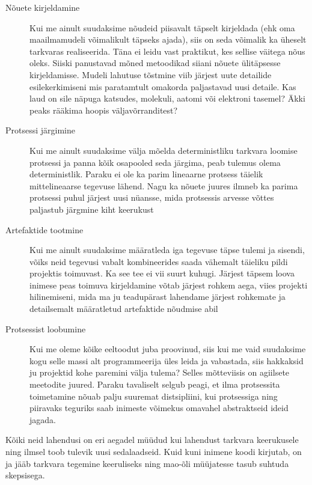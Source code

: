 \documentclass{tufte-book}
\begin{document}
\begin{description}
	\item[Nõuete kirjeldamine] Kui me ainult suudaksime nõudeid piisavalt täpselt kirjeldada (ehk oma maailmamudeli võimalikult täpseks ajada), siis on seda võimalik ka üheselt tarkvaras realiseerida. Täna ei leidu vast praktikut, kes sellise väitega nõus oleks. Siiski panustavad mõned metoodikad siiani nõuete ülitäpsesse kirjeldamisse. Mudeli lahutuse tõstmine viib järjest uute detailide esilekerkimiseni mis paratamtult omakorda paljastavad uusi detaile. Kas laud on sile näpuga katsudes, molekuli, aatomi või elektroni tasemel? Äkki peaks rääkima hoopis väljavõrranditest?
	\item[Protsessi järgimine] Kui me ainult suudaksime välja mõelda deterministliku tarkvara loomise protsessi ja panna kõik osapooled seda järgima, peab tulemus olema deterministlik. Paraku ei ole ka parim lineaarne protsess täielik mittelineaarse tegevuse lähend. Nagu ka nõuete juures ilmneb ka parima protsessi puhul järjest uusi nüansse, mida protsessis arvesse võttes paljastub järgmine kiht keerukust
	\item[Artefaktide tootmine] Kui me ainult suudaksime määratleda iga tegevuse täpse tulemi ja sisendi, võiks neid tegevusi vabalt kombineerides saada vähemalt täieliku pildi projektis toimuvast. Ka see tee ei vii suurt kuhugi. Järjest täpsem loova inimese peas toimuva kirjeldamine võtab järjest rohkem aega, viies projekti hilinemiseni, mida ma ju teadupärast lahendame järjest rohkemate ja detailsemalt määratletud artefaktide nõudmise abil
	\item[Protsessist loobumine] Kui me oleme kõike eeltoodut juba proovinud, siis kui me vaid suudaksime kogu selle massi alt programmeerija üles leida ja vabastada, siis hakkaksid ju projektid kohe paremini välja tulema? Selles mõtteviisis on agiilsete meetodite juured. Paraku tavaliselt selgub peagi, et ilma protsessita toimetamine nõuab palju suuremat distsipliini, kui protsessiga ning piiravaks teguriks saab inimeste võimekus omavahel abstraktseid ideid jagada. 
\end{description}

Kõiki neid lahendusi on eri aegadel müüdud kui lahendust tarkvara keerukusele ning ilmsel toob tulevik uusi sedalaadseid. Kuid kuni inimene koodi kirjutab, on ja jääb tarkvara tegemine keeruliseks ning mao-õli müüjatesse tasub suhtuda skepsisega.
\end{document}

